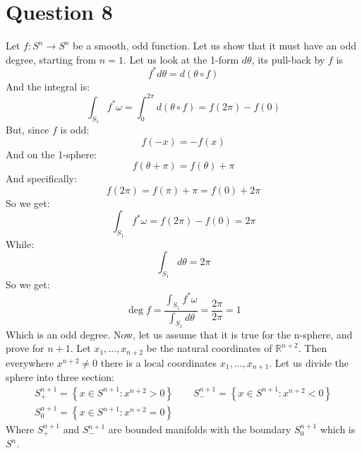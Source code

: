 \documentclass{article}
\newcommand{\R}{\ensuremath{\mathbb{R}}}
\begin{document}
\section*{Question 8}
Let $f: S^n \rightarrow S^n$ be a smooth, odd function. Let us show that it must have an odd degree, starting from $n=1$. Let us look at the 1-form $d\theta$, its pull-back by $f$ is
\begin{equation}
    f^* d\theta = d(\theta \circ f)
\end{equation}
And the integral is:
\begin{equation}
    \int_{S_1} f^* \omega = \int_{0}^{2\pi} d(\theta \circ f) = f(2\pi) - f(0)
\end{equation}
But, since $f$ is odd:
\begin{equation}
    f(-x) = -f(x)
\end{equation}
And on the 1-sphere:
\begin{equation}
    f(\theta + \pi) = f(\theta) + \pi
\end{equation}
And specifically:
\begin{equation}
    f(2\pi) = f(\pi) + \pi = f(0) + 2\pi
\end{equation}
So we get:
\begin{equation}
    \int_{S_1} f^* \omega = f(2\pi) - f(0) = 2\pi
\end{equation}
While:
\begin{equation}
    \int_{S_1} d\theta = 2\pi
\end{equation}
So we get:
\begin{equation}
    \deg f = \frac{\int_{S_1} f^* \omega}{\int_{S_1} d\theta} = \frac{2\pi}{2\pi} = 1
\end{equation}
Which is an odd degree. Now, let us assume that it is true for the n-sphere, and prove for $n+1$. Let $x_1, \dots, x_{n+2}$ be the natural coordinates of $\R^{n+2}$. Then everywhere $x^{n+2} \ne 0$ there is a local coordinates $x_1, \dots, x_{n+1}$. Let us divide the sphere into three section:
\begin{equation}
\begin{gathered}
    S^{n+1}_{+} = \left\{x \in S^{n+1} : x^{n+2} > 0\right\}
    \qquad
    S^{n+1}_{-} = \left\{x \in S^{n+1} : x^{n+2} < 0\right\}
    \\
    S^{n+1}_0 = \left\{x \in S^{n+1} : x^{n+2} = 0\right\}
\end{gathered}
\end{equation}
Where $S^{n+1}_{+}$ and $S^{n+1}_{-}$ are bounded manifolds with the boundary $S^{n+1}_0$ which is $S^{n}$.
\end{document}

